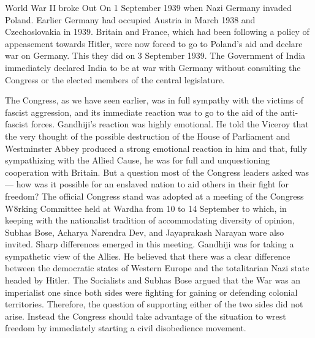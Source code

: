 \begin{multicols}{2}
World War II broke Out On 1 September 1939 when Nazi Germany invaded Poland. Earlier Germany had occupied Austria in March 1938 and Czechoslovakia in 1939. Britain and France, which had been following a policy of appeasement towards Hitler, were now forced to go to Poland's aid and declare war on Germany. This they did on 3 September 1939. The Government of India immediately declared India to be at war with Germany without consulting the Congress or the elected members of the central legislature. 

The Congress, as we have seen earlier, was in full sympathy with the victims of fascist aggression, and its immediate reaction was to go to the aid of the anti-fascist forces. Gandhiji's reaction was highly emotional. He told the Viceroy that the very thought of the possible destruction of the House of Parliament and Westminster Abbey produced a strong emotional reaction in him and that, fully sympathizing with the Allied Cause, he was for full and unquestioning cooperation with Britain. But a question most of the Congress leaders asked was --- how was it possible for an enslaved nation to aid others in their fight for freedom? The official Congress stand was adopted at a meeting of the Congress W8rking Committee held at Wardha from 10 to 14 September to which, in keeping with the nationalist tradition of accommodating diversity of opinion, Subhas Bose, Acharya Narendra Dev, and Jayaprakash Narayan ware also invited. Sharp differences emerged in this meeting. Gandhiji was for taking a sympathetic view of the Allies. He believed that there was a clear difference between the democratic states of Western Europe and the totalitarian Nazi state headed by Hitler. The Socialists and Subhas Bose argued that the War was an imperialist one since both sides were fighting for gaining or defending colonial territories. Therefore, the question of supporting either of the two sides did not arise. Instead the Congress should take advantage of the situation to wrest freedom by immediately starting a civil disobedience movement. 


\end{multicols}
